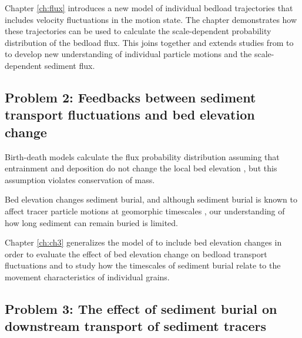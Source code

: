 Chapter \ref{ch:flux} introduces a new model of individual bedload trajectories that includes velocity fluctuations in the motion state. The chapter \DIFdelbegin {}\DIFdelend demonstrates how these trajectories can be used to calculate the scale-dependent probability distribution of the bedload flux.
This \DIFaddbegin {}\DIFaddend joins together and extends studies from \citet{Einstein1937} to \DIFdelbegin {}\DIFdelend \DIFaddbegin {}\DIFaddend to develop new understanding of individual particle motions and the scale-dependent sediment flux.

\subsection{Problem 2: Feedbacks between sediment transport fluctuations and bed elevation change}

Birth-death models calculate the flux probability distribution assuming that entrainment and deposition do not change the local bed elevation \citep{Heyman2013,Ancey2014}, but this assumption violates conservation of mass.

Bed elevation changes \DIFdelbegin {}\DIFdelend \DIFaddbegin {}\DIFaddend sediment burial, and although sediment burial is known to affect tracer particle motions at geomorphic timescales \citep{Ferguson2002,Hassan2017}, our understanding of how long sediment can remain buried is limited.

Chapter \ref{ch:ch3} generalizes the model of \citet{Ancey2008} to include bed elevation changes in order to evaluate the effect of bed elevation change on bedload transport fluctuations and to study how the timescales of sediment burial relate to the movement characteristics of individual grains.

\subsection{Problem 3: The effect of sediment burial on downstream transport of sediment tracers}

